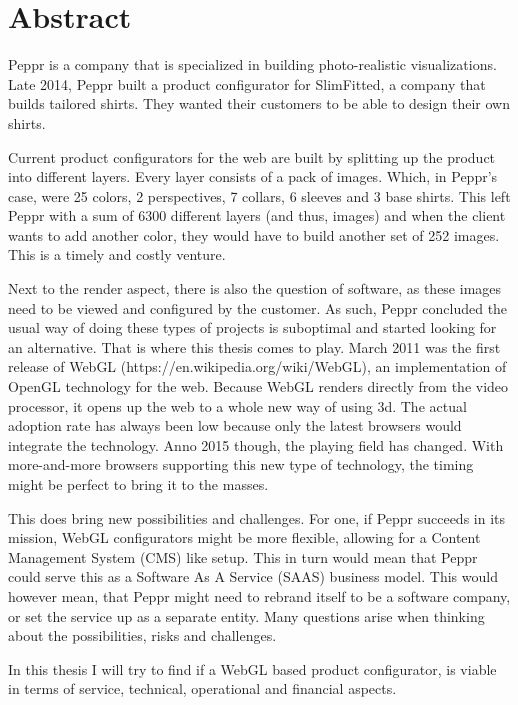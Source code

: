\chapter*{Abstract}%

Peppr is a company that is specialized in building photo-realistic visualizations. Late 2014, Peppr built a product configurator for SlimFitted, a company that builds tailored shirts. They wanted their customers to be able to design their own shirts. 

Current product configurators for the web are built by splitting up the product into different layers. Every layer consists of a pack of images. Which, in Peppr's case, were 25 colors, 2 perspectives, 7 collars, 6 sleeves and 3 base shirts. This left Peppr with a sum of 6300 different layers (and thus, images) and when the client wants to add another color, they would have to build another set of 252 images. This is a timely and costly venture.

Next to the render aspect, there is also the question of software, as these images need to be viewed and configured by the customer. As such, Peppr concluded the usual way of doing these types of projects is suboptimal and started looking for an alternative. That is where this thesis comes to play. March 2011 was the first release of WebGL (https://en.wikipedia.org/wiki/WebGL), an implementation of OpenGL technology for the web. Because WebGL renders directly from the video processor, it opens up the web to a whole new way of using 3d. The actual adoption rate has always been low because only the latest browsers would integrate the technology. Anno 2015 though, the playing field has changed. With more-and-more browsers supporting this new type of technology, the timing might be perfect to bring it to the masses.

This does bring new possibilities and challenges. For one, if Peppr succeeds in its mission, WebGL configurators might be more flexible, allowing for a Content Management System (CMS) like setup. This in turn would mean that Peppr could serve this as a Software As A Service (SAAS) business model. This would however mean, that Peppr might need to rebrand itself to be a software company, or set the service up as a separate entity. Many questions arise when thinking about the possibilities, risks and challenges.

In this thesis I will try to find if a WebGL based product configurator, is viable in terms of service, technical, operational and financial aspects.